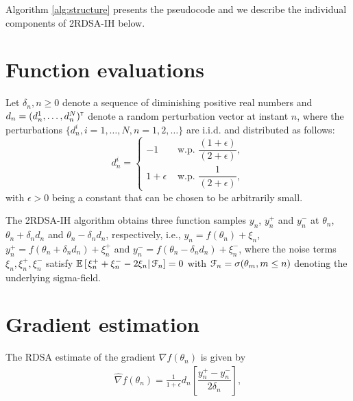 Algorithm \ref{alg:structure} presents the pseudocode and we describe the individual components of 2RDSA-IH below.
\section{Function evaluations}
Let $\delta_n, n\geq 0$ denote a sequence of diminishing positive real numbers and $d_n = (d_n^1,\ldots,d_n^N)^\mathsf{\scriptscriptstyle T}$ denote a random perturbation vector at instant $n$,
where the perturbations $\{d_n^i, i=1,\ldots,N, n=1,2,\ldots\}$ are i.i.d. and distributed  as follows: 
\begin{equation}
\label{eq:det-proj}
 d_n^i =
  \begin{cases}
   -1 &  \text{ w.p. } \dfrac{(1+\epsilon)}{(2+\epsilon)}, \\
   1+\epsilon &  \text{ w.p. } \dfrac{1}{(2+\epsilon)},
  \end{cases}
\end{equation}
with $\epsilon>0$ being a constant that can be chosen to be arbitrarily small.

The 2RDSA-IH algorithm obtains three function samples $y_n$, $y_n^+$ and $y_n^-$ at $\theta_n$, $\theta_n+\delta_n d_n$ and $\theta_n - \delta_n d_n$, respectively, i.e.,
$y_n = f(\theta_n) + \xi_n$, $y_n^+ = f(\theta_n+\delta_n d_n) + \xi_n^+$ and 
$y_n^- = f(\theta_n-\delta_n d_n) + \xi_n^-$,
where the noise terms $\xi_n, \xi_n^+, \xi_n^-$ satisfy $\mathbb{E}\left[\left.\xi_n^+ + \xi_n^- - 2\xi_n \right| \mathcal{F}_n\right] = 0$ with $\mathcal{F}_n = \sigma(\theta_m,m\le n)$ denoting the underlying sigma-field. 

\section{Gradient estimation}
The RDSA estimate of the gradient $\nabla f(\theta_n)$ is given by
\begin{align}
\label{eq:grad-ber}
\widehat\nabla f(\theta_n) = \frac1{1+\epsilon} d_n \left[ \dfrac{y_n^+ - y_n^-}{2\delta_n}\right],
\end{align}

